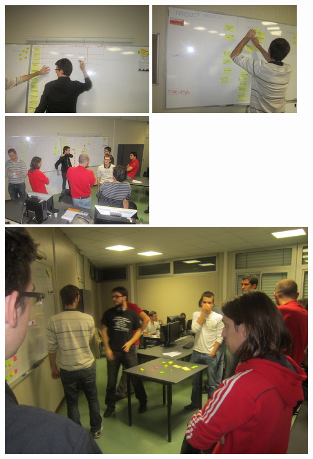 \documentclass[a4paper,francais,titlepage]{report}
\begin{document}
\begin{center}
\includegraphics[scale=0.3]{backlog.jpeg}
\includegraphics[scale=0.3]{backlog2.jpeg}
\includegraphics[scale=0.3]{brainstorming.jpeg}
\\
\includegraphics[scale=0.3]{brainstorming2.jpeg}\\

\end{center}
\end{document}
